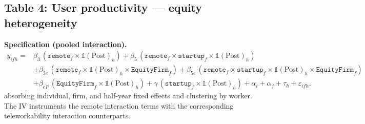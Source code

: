 \documentclass{article}
\newcommand{\cleanedresultsdir}{../../results/cleaned/tex}
\newcommand{\TableInput}[2][\linewidth]{}
\newcommand{\FloatNote}[1]{%
  \begingroup
    \captionsetup{style=noteflush}%
    \caption*{\textit{Notes:}~#1}%
  \endgroup
}
\begin{document}
\subsection*{Table 4: User productivity --- equity heterogeneity}
\noindent \textbf{Specification (pooled interaction).}
\begin{equation*}
\begin{aligned}
  y_{ifh} ={}&
  \beta_3\,(\texttt{remote}_f\times \mathds{1}(\text{Post})_h)
  + \beta_5\,(\texttt{remote}_f\times \texttt{startup}_f\times \mathds{1}(\text{Post})_h) \\
  &+ \beta_{3e}\,(\texttt{remote}_f\times \mathds{1}(\text{Post})_h\times \texttt{EquityFirm}_f)
  + \beta_{5e}\,(\texttt{remote}_f\times \texttt{startup}_f\times \mathds{1}(\text{Post})_h\times \texttt{EquityFirm}_f) \\
  &+ \beta_{eP}\,(\texttt{EquityFirm}_f\times \mathds{1}(\text{Post})_h)
  + \gamma\,(\texttt{startup}_f\times \mathds{1}(\text{Post})_h)
  + \alpha_i + \alpha_f + \tau_h + \varepsilon_{ifh}.
\end{aligned}
\end{equation*}
absorbing individual, firm, and half-year fixed effects and clustering by worker. The IV instruments the remote interaction terms with the corresponding teleworkability interaction counterparts.
\begin{table}[H]\centering
  \caption{User productivity: pooled interaction + split baseline}
  \TableInput{\cleanedresultsdir/user_productivity_llm_equity_heterogeneity_precovid.tex}
  \FloatNote{Outcome is contribution rank (percentile) at the user$\times$half-year level. Column structure matches Table 3: pooled interaction model in columns (1)--(2) and split baseline model in columns (3)--(6). Rows correspond to the labeled interaction terms. In pooled columns, compute group-specific post remote effects by adding coefficients exactly as in Table 3 (e.g., startup/equity uses $\beta_3+\beta_5+\beta_{3e}+\beta_{5e}$). In split columns, the post remote effect for non-startups is the coefficient on $\texttt{Remote}\times\mathds{1}(\text{Post})$ and for startups is the sum of that coefficient plus the $\texttt{Remote}\times\mathds{1}(\text{Post})\times\text{Startup}$ coefficient. ``KP rk Wald F'' is the Kleibergen--Paap rk Wald F statistic in IV columns. Standard errors are clustered by worker and reported in parentheses; *, **, *** denote $p<0.10, 0.05, 0.01$.}
\end{table}
\end{document}

